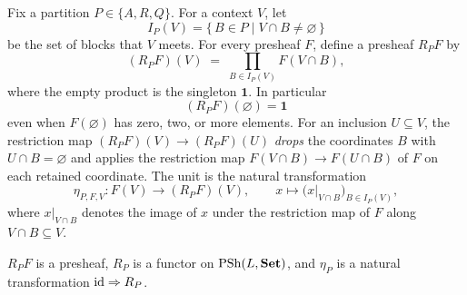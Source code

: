 \begin{construction}
\label{ch10:con:reflector}
Fix a partition $P \in \{A, R, Q\}$. For a context $V$, let
\[
I_P(V) = \{\, B \in P \mid V \cap B \neq \varnothing \,\}
\]
be the set of blocks that $V$ meets. For every presheaf $F$, define a presheaf
$R_P F$ by
\begin{equation}
\label{ch10:eq:reflector}
(R_P F)(V) \;=\; \prod_{B \in I_P(V)} F(V \cap B),
\end{equation}
where the empty product is the singleton $\mathbf{1}$. In particular
\begin{equation}
\label{ch10:eq:emptyclause}
(R_P F)(\varnothing) = \mathbf{1}
\end{equation}
even when $F(\varnothing)$ has zero, two, or more elements. For an inclusion
$U \subseteq V$, the restriction map
$(R_P F)(V) \to (R_P F)(U)$ \emph{drops} the coordinates $B$ with
$U \cap B = \varnothing$ and applies the restriction map
$F(V \cap B) \to F(U \cap B)$ of $F$ on each retained coordinate. The unit is
the natural transformation
\begin{equation}
\label{ch10:eq:unit}
\eta_{P, F, V} : F(V) \to (R_P F)(V), \qquad
x \mapsto \bigl( x|_{V \cap B} \bigr)_{B \in I_P(V)},
\end{equation}
where $x|_{V \cap B}$ denotes the image of $x$ under the restriction map of
$F$ along $V \cap B \subseteq V$.
\end{construction}

\begin{proposition}
\label{ch10:prop:welldef}
$R_P F$ is a presheaf, $R_P$ is a functor on $\mathrm{PSh}(L, \mathbf{Set})$, and $\eta_P$ is a
natural transformation $\mathrm{id} \Rightarrow R_P$.
\end{proposition}

